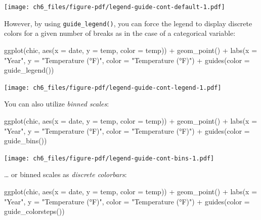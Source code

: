 \documentclass[
  letterpaper,
  DIV=11,
  numbers=noendperiod]{scrreprt}
\newenvironment{Shaded}{\begin{snugshade}}{\end{snugshade}}
\newcommand{\AttributeTok}[1]{\textcolor[rgb]{0.40,0.45,0.13}{#1}}
\newcommand{\FunctionTok}[1]{\textcolor[rgb]{0.28,0.35,0.67}{#1}}
\newcommand{\NormalTok}[1]{\textcolor[rgb]{0.00,0.23,0.31}{#1}}
\newcommand{\SpecialCharTok}[1]{\textcolor[rgb]{0.37,0.37,0.37}{#1}}
\newcommand{\StringTok}[1]{\textcolor[rgb]{0.13,0.47,0.30}{#1}}
\begin{document}
\texttt{[image: ch6\_files/figure-pdf/legend-guide-cont-default-1.pdf]}

However, by using \texttt{guide\_legend()}, you can force the legend to
display discrete colors for a given number of breaks as in the case of a
categorical variable:

\begin{Shaded}
\begin{Highlighting}[]
\FunctionTok{ggplot}\NormalTok{(chic,}
       \FunctionTok{aes}\NormalTok{(}\AttributeTok{x =}\NormalTok{ date, }\AttributeTok{y =}\NormalTok{ temp, }\AttributeTok{color =}\NormalTok{ temp)) }\SpecialCharTok{+}
  \FunctionTok{geom\_point}\NormalTok{() }\SpecialCharTok{+}
  \FunctionTok{labs}\NormalTok{(}\AttributeTok{x =} \StringTok{"Year"}\NormalTok{, }\AttributeTok{y =} \StringTok{"Temperature (°F)"}\NormalTok{, }\AttributeTok{color =} \StringTok{"Temperature (°F)"}\NormalTok{) }\SpecialCharTok{+}
  \FunctionTok{guides}\NormalTok{(}\AttributeTok{color =} \FunctionTok{guide\_legend}\NormalTok{())}
\end{Highlighting}
\end{Shaded}

\texttt{[image: ch6\_files/figure-pdf/legend-guide-cont-legend-1.pdf]}

You can also utilize \emph{\emph{binned scales}}:

\begin{Shaded}
\begin{Highlighting}[]
\FunctionTok{ggplot}\NormalTok{(chic,}
       \FunctionTok{aes}\NormalTok{(}\AttributeTok{x =}\NormalTok{ date, }\AttributeTok{y =}\NormalTok{ temp, }\AttributeTok{color =}\NormalTok{ temp)) }\SpecialCharTok{+}
  \FunctionTok{geom\_point}\NormalTok{() }\SpecialCharTok{+}
  \FunctionTok{labs}\NormalTok{(}\AttributeTok{x =} \StringTok{"Year"}\NormalTok{, }\AttributeTok{y =} \StringTok{"Temperature (°F)"}\NormalTok{, }\AttributeTok{color =} \StringTok{"Temperature (°F)"}\NormalTok{) }\SpecialCharTok{+}
  \FunctionTok{guides}\NormalTok{(}\AttributeTok{color =} \FunctionTok{guide\_bins}\NormalTok{())}
\end{Highlighting}
\end{Shaded}

\texttt{[image: ch6\_files/figure-pdf/legend-guide-cont-bins-1.pdf]}

\ldots{} or binned scales as \emph{\emph{discrete colorbars}}:

\begin{Shaded}
\begin{Highlighting}[]
\FunctionTok{ggplot}\NormalTok{(chic,}
       \FunctionTok{aes}\NormalTok{(}\AttributeTok{x =}\NormalTok{ date, }\AttributeTok{y =}\NormalTok{ temp, }\AttributeTok{color =}\NormalTok{ temp)) }\SpecialCharTok{+}
  \FunctionTok{geom\_point}\NormalTok{() }\SpecialCharTok{+}
  \FunctionTok{labs}\NormalTok{(}\AttributeTok{x =} \StringTok{"Year"}\NormalTok{, }\AttributeTok{y =} \StringTok{"Temperature (°F)"}\NormalTok{, }\AttributeTok{color =} \StringTok{"Temperature (°F)"}\NormalTok{) }\SpecialCharTok{+}
  \FunctionTok{guides}\NormalTok{(}\AttributeTok{color =} \FunctionTok{guide\_colorsteps}\NormalTok{())}
\end{Highlighting}
\end{Shaded}
\end{document}
